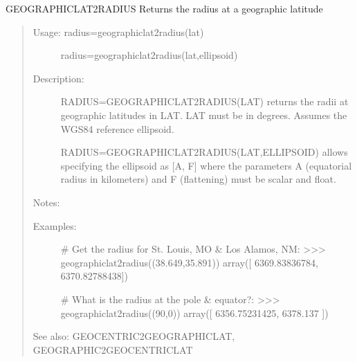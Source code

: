 \documentclass[letterpaper,10pt,english]{sphinxmanual}
\begin{document}

\begin{fulllineitems}
\label{\detokenize{infrapy.utils:infrapy.utils.latlon.geographiclat2radius}}
GEOGRAPHICLAT2RADIUS    Returns the radius at a geographic latitude
\begin{quote}
\begin{description}
\item[{Usage:    radius=geographiclat2radius(lat)}] \leavevmode
radius=geographiclat2radius(lat,ellipsoid)

\item[{Description:}] \leavevmode
RADIUS=GEOGRAPHICLAT2RADIUS(LAT) returns the radii at geographic
latitudes in LAT.  LAT must be in degrees.  Assumes the WGS\sphinxhyphen{}84
reference ellipsoid.

RADIUS=GEOGRAPHICLAT2RADIUS(LAT,ELLIPSOID) allows specifying the
ellipsoid as {[}A, F{]} where the parameters A (equatorial radius in
kilometers) and F (flattening) must be scalar and float.

\end{description}

Notes:
\begin{description}
\item[{Examples:}] \leavevmode
\# Get the radius for St. Louis, MO \& Los Alamos, NM:
\textgreater{}\textgreater{}\textgreater{} geographiclat2radius((38.649,35.891))
array({[} 6369.83836784,  6370.82788438{]})

\# What is the radius at the pole \& equator?:
\textgreater{}\textgreater{}\textgreater{} geographiclat2radius((90,0))
array({[} 6356.75231425,  6378.137     {]})

\end{description}

See also: GEOCENTRIC2GEOGRAPHICLAT, GEOGRAPHIC2GEOCENTRICLAT
\end{quote}

\end{fulllineitems}

\end{document}

